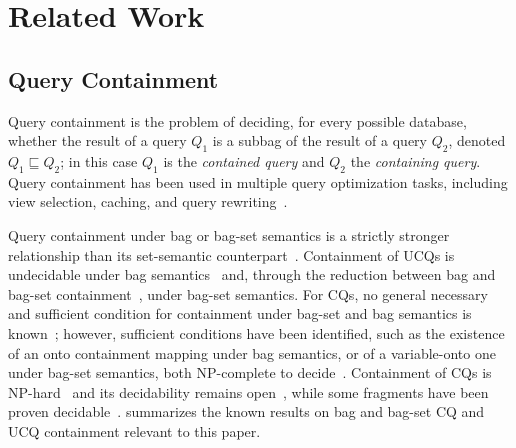 \section{Related Work}\label{sec:related_works}

\subsection{Query Containment}\label{sec:related_works_qc}

Query containment is the problem of deciding, for every possible database, whether the result of a query $Q_1$ is a subbag of the result of a query $Q_2$, denoted $Q_1 \sqsubseteq Q_2$; in this case $Q_1$ is the \emph{contained query} and $Q_2$ the \emph{containing query}.
Query containment has been used in multiple query optimization tasks, including view selection, caching, and query rewriting~\cite{Afrati2019-ch2, chirkova2012materialized, Halevy2001}.

Query containment under bag or bag-set semantics is a strictly stronger relationship than its set-semantic counterpart~\cite{Chaudhuri1993}.
Containment of \acp{UCQ} is undecidable under bag semantics~\cite{ioannidis1995containment} and, through the reduction between bag and bag-set containment~\cite{Jayram2006}, under bag-set semantics.
For \acp{CQ}, no general necessary and sufficient condition for containment under bag-set and bag semantics is known~\cite{ioannidis1995containment, khamis2021bag}; however, sufficient conditions have been identified, such as the existence of an onto containment mapping under bag semantics, or of a variable-onto one under bag-set semantics, both NP-complete to decide~\cite{Chaudhuri1993}.
Containment of \acp{CQ} is NP-hard~\cite{Afrati2010, Konstantinidis2019} and its decidability remains open~\cite{khamis2021bag, marcinkowski2024bag}, while some fragments have been proven decidable~\cite{khamis2021bag, KOPPARTY20111097, Chaudhuri1993, Afrati2010, Konstantinidis2019, konstantinidis_et_al:LIPIcs.ICDT.2025.5}.
 summarizes the known results on bag and bag-set \ac{CQ} and \ac{UCQ} containment relevant to this paper.

